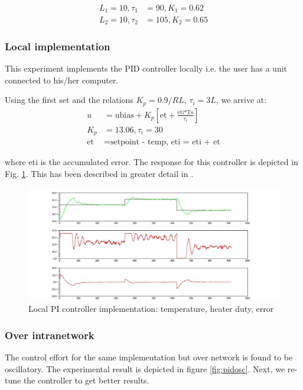 \begin{align*}
L_1 = 10, \tau_1 &= 90, K_1 = 0.62 \\
L_2 = 10, \tau_2 &= 105,K_2 = 0.65
\end{align*}


\subsubsection{Local implementation}
This experiment implements the PID controller locally i.e. the user has a unit connected to his/her computer.

Using the first set and the relations $K_p=0.9/RL$,
$\tau_i=3L$, we arrive at:
\begin{align*}
u & = \text{ubias} + K_p\left[\text{et} +
  \frac{\text{eti*Ts}}{\tau_i}\right] \\ 
K_p & = 13.06, \tau_i = 30 \\
\text{et} & = \text{setpoint - temp, eti = eti + et}
\end{align*}
 
where eti is the accumulated error.  The response for this controller
is depicted in Fig. \ref{fig:pid-2}.  This has been described in greater detail in \cite{ia010}.

\begin{figure}
\hspace{-0.2in}
\includegraphics[width=1.2\linewidth]{figures/pi-1}
\caption{Local PI controller implementation: temperature, heater duty,
  error} 
\label{fig:pid-2}
\end{figure}


\subsubsection{Over intranetwork}
The control effort for the same implementation but over network is found to be oscillatory.  The experimental result is depicted in figure \ref{fig:pidosc}.  Next, we re-tune the controller to get better results.

